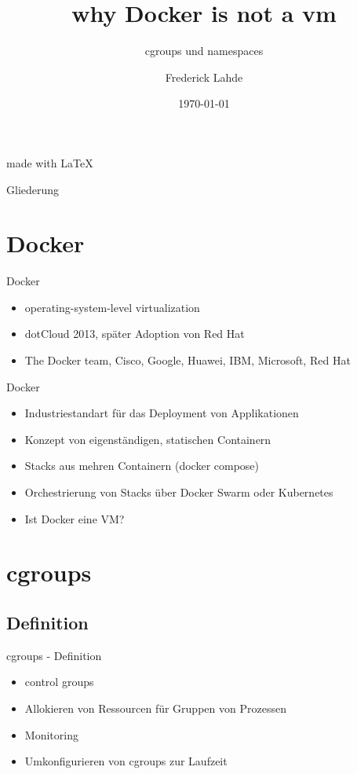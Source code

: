 \documentclass[14pt]{beamer}
\author{
    Frederick Lahde
  }
\title[]{why Docker is not a vm}
\subtitle{cgroups und namespaces}
\institute{Hochschule Emden/Leer}
\date{\today}
\begin{document}
    \begin{frame}[plain]
      \maketitle
      \centering
      \begin{figure}[H]
      \end{figure}
      \tiny{made with \LaTeX}
    \end{frame}
  
    \begin{frame}{Gliederung}
      \setcounter{tocdepth}{1}
      \tableofcontents
    \end{frame}
    
    \section{Docker}
    \begin{frame}{Docker}
    \begin{itemize}
    \item operating-system-level virtualization
    \item dotCloud 2013, später Adoption von Red Hat
    \item The Docker team, Cisco, Google, Huawei, IBM, Microsoft, Red Hat
    \end{itemize}
    \end{frame}
    
    \begin{frame}{Docker}
    \begin{itemize}
    \item Industriestandart für das Deployment von Applikationen
    \item Konzept von eigenständigen, statischen Containern
    \item Stacks aus mehren Containern (docker compose)
    \item Orchestrierung von Stacks über Docker Swarm oder Kubernetes
    \item Ist Docker eine VM?
    \end{itemize}
    \end{frame}
    
    \section{cgroups}
    \subsection{Definition}
    \begin{frame}{cgroups - Definition}
    	\begin{itemize}
    	\item control groups
        \item Allokieren von Ressourcen für Gruppen von Prozessen
        \item Monitoring
        \item Umkonfigurieren von cgroups zur Laufzeit
    	\end{itemize}
    \end{frame}
\end{document}
